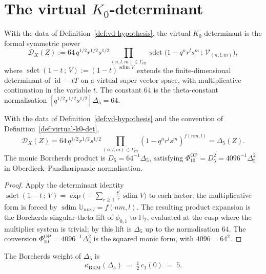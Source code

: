 \documentclass[11pt]{memoir}
\providecommand{\id}{\operatorname{id}}
\providecommand{\sdet}{\operatorname{sdet}}
\providecommand{\sdim}{\operatorname{sdim}}
\providecommand{\BKM}{\operatorname{BKM}}
\providecommand{\cD}{\mathcal{D}}
\providecommand{\cV}{\mathcal{V}}
\providecommand{\bH}{\mathbb{H}}
\providecommand{\bU}{\mathbb{U}}
\begin{document}
\section{The virtual $K_0$-determinant}
\label{sec:vd-construction}

\begin{definition}
\label{def:virtual-k0-det}
With the data of Definition~\ref{def:vd-hypothesis}, the virtual
$K_0$-determinant is the formal symmetric power
\[
  \cD_X(Z)
  := 64\, q^{1/2} r^{1/2} s^{1/2}
  \prod_{(n,l,m)\in\Gamma_{\mathrm{eff}}}
  \sdet\bigl(1 - q^{n} r^{l} s^{m}\,;\, \cV_{(n,l,m)}\bigr),
\]
where $\sdet(1 - t\,;\, V) := (1-t)^{\sdim V}$ extends the
finite-dimensional determinant of $\id - tT$ on a virtual super vector
space, with multiplicative continuation in the variable $t$. The
constant $64$ is the theta-constant normalisation
$[q^{1/2} r^{1/2} s^{1/2}]\Delta_5 = 64$.
\end{definition}

\begin{theorem}
\label{thm:k0-det-equals-Delta5}
With the data of Definition~\ref{def:vd-hypothesis} and the convention
of Definition~\ref{def:virtual-k0-det},
\[
  \cD_X(Z)
  = 64\,q^{1/2}r^{1/2}s^{1/2}
  \prod_{(n,l,m)\in\Gamma_{\mathrm{eff}}}
  (1 - q^{n} r^{l} s^{m})^{f(nm,l)}
  = \Delta_5(Z).
\]
The monic Borcherds product is $D_5 = 64^{-1}\Delta_5$, satisfying
$\Phi_{10}^{\mathrm{OP}} = D_5^2 = 4096^{-1}\Delta_5^2$ in
Oberdieck--Pandharipande normalisation.
\end{theorem}

\begin{proof}
Apply the determinant identity
$\sdet(1-t\,;\,V) = \exp\bigl(-\sum_{r\ge1} \tfrac{t^r}{r} \sdim V\bigr)$
to each factor; the multiplicative form is forced by
$\sdim \bU_{nm,l} = f(nm,l)$. The resulting product expansion is the
Borcherds singular-theta lift of $\phi_{0,1}$ to $\bH_2$, evaluated at
the cusp where the multiplier system is trivial; by
\cite{Borcherds1995, GritsenkoNikulin1998} this lift is $\Delta_5$ up
to the normalisation $64$. The conversion $\Phi_{10}^{\mathrm{OP}} =
4096^{-1}\Delta_5^2$ is the squared monic form, with
$4096 = 64^2$.
\end{proof}

\begin{proposition}[universal Borcherds-weight identity at $N=1$]
\label{prop:borcherds-weight}
The Borcherds weight of $\Delta_5$ is
\[
  \kappa_{\BKM}(\Delta_5)
  \;=\; \tfrac12\,c_1(0)
  \;=\; 5.
\]
\end{proposition}
\end{document}
